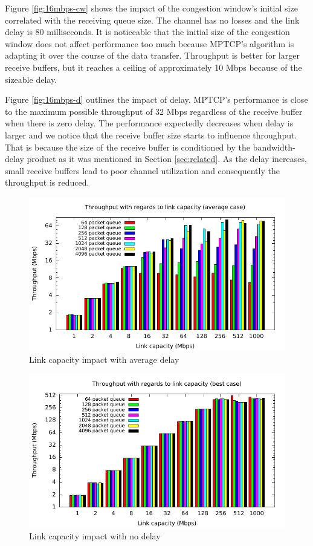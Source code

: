 Figure \ref{fig:16mbps-cw} shows the impact of the congestion window's initial
size correlated with the receiving queue size. The channel has no losses and
the link delay is 80 milliseconds. It is noticeable that the initial size of
the congestion window does not affect performance too much because MPTCP's
algorithm is adapting it over the course of the data transfer. Throughput is
better for larger receive buffers, but it reaches a ceiling of approximately
10 Mbps because of the sizeable delay.

Figure \ref{fig:16mbps-d} outlines the impact of delay. MPTCP's performance is
close to the maximum possible throughput of 32 Mbps regardless of the receive
buffer when there is zero delay. The performance expectedly decreases when delay
is larger and we notice that the receive buffer size starts to influence
throughput. That is because the size of the receive buffer is conditioned by the
bandwidth-delay product as it was mentioned in Section \ref{sec:related}.
As the delay increases, small receive buffers lead to poor channel utilization
and consequently the throughput is reduced.

\begin{figure}
  \centering
  \includegraphics[width=\textwidth]{img/throughput-bdw-avg}
  \caption{Link capacity impact with average delay}
  \label{fig:bdw-avg}
\end{figure}

\begin{figure}
  \centering
  \includegraphics[width=\textwidth]{img/throughput-bdw-max}
  \caption{Link capacity impact with no delay}
  \label{fig:bdw-max}
\end{figure}

